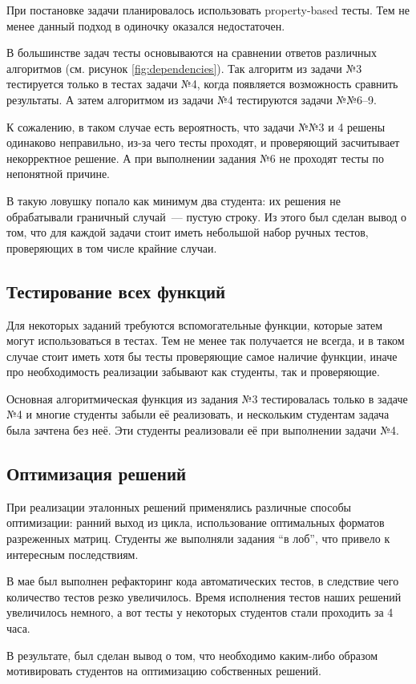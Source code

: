 При постановке задачи планировалось использовать property-based тесты.
Тем не менее данный подход в одиночку оказался недостаточен.

В большинстве задач тесты основываются на сравнении ответов различных алгоритмов (см. рисунок \ref{fig:dependencies}).
Так алгоритм из задачи №3 тестируется только в тестах задачи №4, когда появляется возможность сравнить результаты.
А затем алгоритмом из задачи №4 тестируются задачи №№6--9.

К сожалению, в таком случае есть вероятность, что задачи №№3 и 4 решены одинаково неправильно, из-за чего тесты проходят, и проверяющий засчитывает некорректное решение.
А при выполнении задания №6 не проходят тесты по непонятной причине.

В такую ловушку попало как минимум два студента: их решения не обрабатывали граничный случай~--- пустую строку.
Из этого был сделан вывод о том, что для каждой задачи стоит иметь небольшой набор ручных тестов, проверяющих в том числе крайние случаи.

\subsection{Тестирование всех функций}

Для некоторых заданий требуются вспомогательные функции, которые затем могут использоваться в тестах.
Тем не менее так получается не всегда, и в таком случае стоит иметь хотя бы тесты проверяющие самое наличие функции, иначе про необходимость реализации забывают как студенты, так и проверяющие.

Основная алгоритмическая функция из задания №3 тестировалась только в задаче №4 и многие студенты забыли её реализовать, и нескольким студентам задача была зачтена без неё.
Эти студенты реализовали её при выполнении задачи №4.

\subsection{Оптимизация решений}

При реализации эталонных решений применялись различные способы оптимизации: ранний выход из цикла, использование оптимальных форматов разреженных матриц.
Студенты же выполняли задания \enquote{в лоб}, что привело к интересным последствиям.

В мае был выполнен рефакторинг кода автоматических тестов, в следствие чего количество тестов резко увеличилось.
Время исполнения тестов наших решений увеличилось немного, а вот тесты у некоторых студентов стали проходить за 4 часа.

В результате, был сделан вывод о том, что необходимо каким-либо образом мотивировать студентов на оптимизацию собственных решений.
